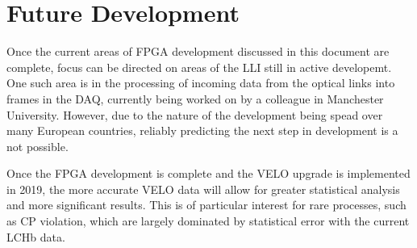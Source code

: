 \section{Future Development}

	Once the current areas of FPGA development discussed in this document are complete, focus can be directed on areas of the LLI still in active developemt.
	One such area is in the processing of incoming data from the optical links into frames in the DAQ, currently being worked on by a colleague in Manchester University.
	However, due to the nature of the development being spead over many European countries, reliably predicting the next step in development is a not possible.
	\par
	Once the FPGA development is complete and the VELO upgrade is implemented in 2019, the more accurate VELO data will allow for greater statistical analysis and more significant results.
	This is of particular interest for rare processes, such as CP violation, which are largely dominated by statistical error with the current LCHb data.

